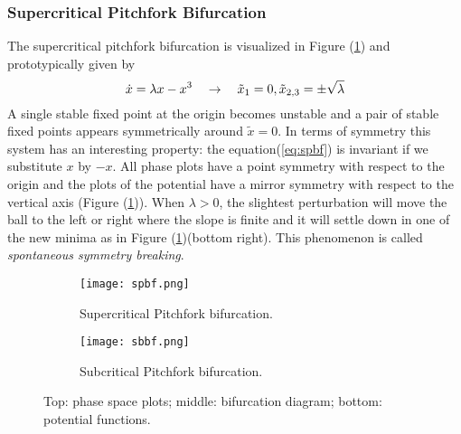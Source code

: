 \subsubsection{Supercritical Pitchfork Bifurcation}{\label{sec:spcpbf}}
The supercritical pitchfork bifurcation is visualized in Figure (\ref{fig:spbf}) and prototypically given by
\begin{equation}{\label{eq:spbf}}
  \dot{x}=\lambda x- x^3 \quad \rightarrow \quad \tilde{x}_1=0, \tilde{x}_{2,3}=\pm\sqrt{\lambda}
\end{equation}
A single stable fixed point at the origin becomes unstable and a pair of stable fixed points appears symmetrically around $\tilde{x}=0$.
In terms of symmetry this system has an interesting property: the equation(\ref{eq:spbf}) is invariant if we substitute $x$ by $-x$.
All phase plots have a point symmetry with respect to the origin and the plots of the potential have a mirror symmetry with respect to the vertical axis (Figure (\ref{fig:spbf})).
When $\lambda>0$, the slightest perturbation will move the ball to the left or right where the slope is finite and it will settle down in one of the new minima as in Figure (\ref{fig:spbf})(bottom right).
This phenomenon is called \emph{spontaneous symmetry breaking}.
\begin{figure}[h!]
  \centering
  \begin{subfigure}{0.45\linewidth}
    \centering
    \texttt{[image: spbf.png]}
    \caption{Supercritical Pitchfork bifurcation.}
    \label{fig:spbf}
  \end{subfigure}
  \vline
  \begin{subfigure}{0.45\linewidth}
    \centering
    \texttt{[image: sbbf.png]}
    \caption{Subcritical Pitchfork bifurcation.}
    \label{fig:sbbf}
  \end{subfigure}
  \caption{Top: phase space plots; middle: bifurcation diagram; bottom: potential functions.}
  \label{fig:sbf}
\end{figure}
